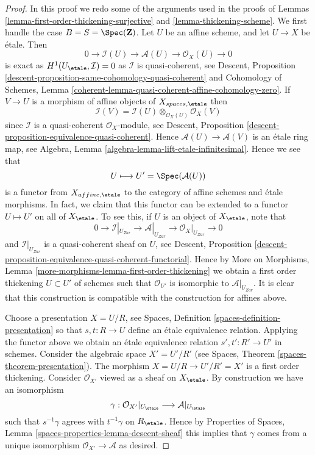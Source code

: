 \begin{proof}
In this proof we redo some of the arguments used in the
proofs of
Lemmas \ref{lemma-first-order-thickening-surjective} and
\ref{lemma-thickening-scheme}.
We first handle the case $B = S = \Spec(\mathbf{Z})$.
Let $U$ be an affine scheme, and let $U \to X$ be \'etale.
Then
$$
0 \to \mathcal{I}(U) \to \mathcal{A}(U) \to \mathcal{O}_X(U) \to 0
$$
is exact as $H^1(U_\etale, \mathcal{I}) = 0$ as
$\mathcal{I}$ is quasi-coherent, see
Descent, Proposition \ref{descent-proposition-same-cohomology-quasi-coherent}
and Cohomology of Schemes, Lemma
\ref{coherent-lemma-quasi-coherent-affine-cohomology-zero}.
If $V \to U$ is a morphism of affine objects of $X_{spaces, \etale}$
then
$$
\mathcal{I}(V) = \mathcal{I}(U) \otimes_{\mathcal{O}_X(U)} \mathcal{O}_X(V)
$$
since $\mathcal{I}$ is a quasi-coherent $\mathcal{O}_X$-module, see
Descent, Proposition \ref{descent-proposition-equivalence-quasi-coherent}.
Hence $\mathcal{A}(U) \to \mathcal{A}(V)$ is an
\'etale ring map, see
Algebra, Lemma \ref{algebra-lemma-lift-etale-infinitesimal}.
Hence we see that
$$
U \longmapsto U' = \Spec(\mathcal{A}(U))
$$
is a functor from $X_{affine, \etale}$ to the category of affine
schemes and \'etale morphisms. In fact, we claim that this functor can
be extended to a functor $U \mapsto U'$ on all of $X_\etale$.
To see this, if $U$ is an object of $X_\etale$, note that
$$
0 \to \mathcal{I}|_{U_{Zar}} \to \mathcal{A}|_{U_{Zar}} \to
\mathcal{O}_X|_{U_{Zar}} \to 0
$$
and $\mathcal{I}|_{U_{Zar}}$ is a quasi-coherent sheaf on $U$, see
Descent,
Proposition \ref{descent-proposition-equivalence-quasi-coherent-functorial}.
Hence by
More on Morphisms, Lemma \ref{more-morphisms-lemma-first-order-thickening}
we obtain a first order thickening $U \subset U'$ of schemes such that
$\mathcal{O}_{U'}$ is isomorphic to $\mathcal{A}|_{U_{Zar}}$. It is clear that
this construction is compatible with the construction for affines above.

\medskip\noindent
Choose a presentation $X = U/R$, see
Spaces, Definition \ref{spaces-definition-presentation}
so that $s, t : R \to U$ define an \'etale equivalence relation.
Applying the functor above we obtain an \'etale equivalence
relation $s', t' : R' \to U'$ in schemes. Consider the algebraic space
$X' = U'/R'$ (see
Spaces, Theorem \ref{spaces-theorem-presentation}).
The morphism $X = U/R \to U'/R' = X'$ is a first order thickening.
Consider $\mathcal{O}_{X'}$ viewed as a sheaf on $X_\etale$.
By construction we have an isomorphism
$$
\gamma :
\mathcal{O}_{X'}|_{U_\etale}
\longrightarrow
\mathcal{A}|_{U_\etale}
$$
such that $s^{-1}\gamma$ agrees with $t^{-1}\gamma$ on $R_\etale$.
Hence by
Properties of Spaces, Lemma \ref{spaces-properties-lemma-descent-sheaf}
this implies that $\gamma$ comes from a unique isomorphism
$\mathcal{O}_{X'} \to \mathcal{A}$ as desired.


\end{proof}
